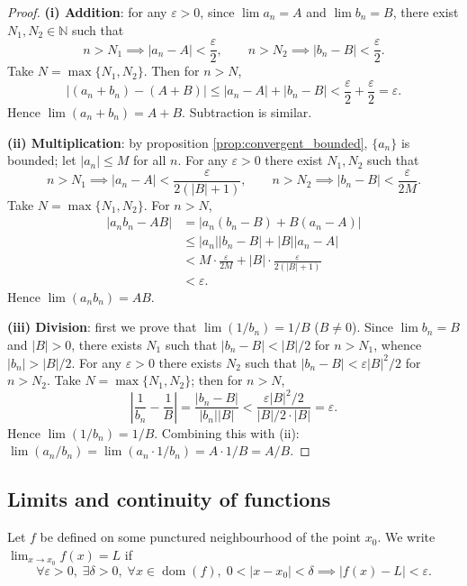 \begin{proof}
\textbf{(i) Addition}: for any $\varepsilon > 0$, since $\lim a_n = A$ and $\lim b_n = B$, there exist $N_1, N_2 \in \mathbb{N}$ such that
\[
n > N_1 \implies |a_n - A| < \frac{\varepsilon}{2}, \qquad n > N_2 \implies |b_n - B| < \frac{\varepsilon}{2}.
\]
Take $N = \max\{N_1, N_2\}$. Then for $n > N$,
\[
|(a_n + b_n) - (A + B)| \le |a_n - A| + |b_n - B| < \frac{\varepsilon}{2} + \frac{\varepsilon}{2} = \varepsilon.
\]
Hence $\lim(a_n + b_n) = A + B$. Subtraction is similar.

\textbf{(ii) Multiplication}: by proposition \ref{prop:convergent_bounded}, $\{a_n\}$ is bounded; let $|a_n| \le M$ for all $n$. For any $\varepsilon > 0$ there exist $N_1, N_2$ such that
\[
n > N_1 \implies |a_n - A| < \frac{\varepsilon}{2(|B| + 1)}, \qquad n > N_2 \implies |b_n - B| < \frac{\varepsilon}{2M}.
\]
Take $N = \max\{N_1, N_2\}$. For $n > N$,
\begin{align*}
|a_n b_n - AB|
&= |a_n(b_n - B) + B(a_n - A)| \\
&\le |a_n||b_n - B| + |B||a_n - A| \\
&< M \cdot \frac{\varepsilon}{2M} + |B| \cdot \frac{\varepsilon}{2(|B|+1)} \\
&< \varepsilon.
\end{align*}
Hence $\lim(a_n b_n) = AB$.

\textbf{(iii) Division}: first we prove that $\lim(1/b_n) = 1/B$ ($B \neq 0$). Since $\lim b_n = B$ and $|B| > 0$, there exists $N_1$ such that $|b_n - B| < |B|/2$ for $n > N_1$, whence $|b_n| > |B|/2$. For any $\varepsilon > 0$ there exists $N_2$ such that $|b_n - B| < \varepsilon |B|^2/2$ for $n > N_2$. Take $N = \max\{N_1, N_2\}$; then for $n > N$,
\[
\left|\frac{1}{b_n} - \frac{1}{B}\right| = \frac{|b_n - B|}{|b_n||B|} < \frac{\varepsilon |B|^2/2}{|B|/2 \cdot |B|} = \varepsilon.
\]
Hence $\lim(1/b_n) = 1/B$. Combining this with (ii): $\lim(a_n/b_n) = \lim(a_n \cdot 1/b_n) = A \cdot 1/B = A/B$.
\end{proof}

\subsection{\texorpdfstring{Limits and continuity of functions}{Limits and continuity of functions}}

\begin{definition}\label{def:func_limit}
Let $f$ be defined on some punctured neighbourhood of the point $x_0$. We write $\displaystyle\lim_{x\to x_0} f(x) = L$ if
\[\forall \varepsilon > 0,\; \exists \delta > 0,\; \forall x \in \operatorname{dom}(f),\; 0 < |x - x_0| < \delta \implies |f(x) - L| < \varepsilon.\]
\end{definition}

